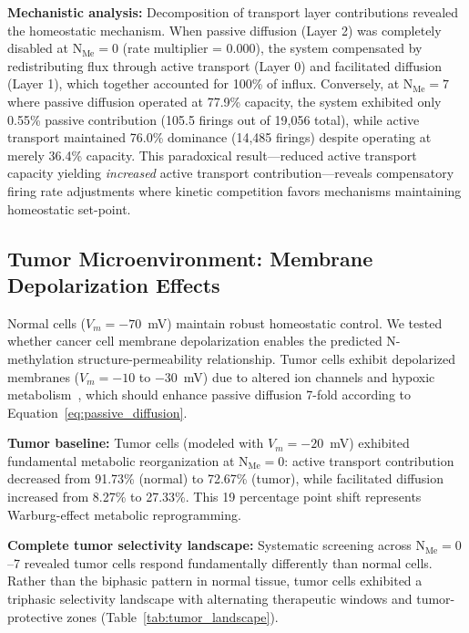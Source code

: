 \documentclass[10pt,letterpaper]{article}
\begin{document}
\textbf{Mechanistic analysis:} Decomposition of transport layer contributions revealed the homeostatic mechanism. When passive diffusion (Layer 2) was completely disabled at N$_{\text{Me}} = 0$ (rate multiplier = 0.000), the system compensated by redistributing flux through active transport (Layer 0) and facilitated diffusion (Layer 1), which together accounted for 100\% of influx. Conversely, at N$_{\text{Me}} = 7$ where passive diffusion operated at 77.9\% capacity, the system exhibited only 0.55\% passive contribution (105.5 firings out of 19,056 total), while active transport maintained 76.0\% dominance (14,485 firings) despite operating at merely 36.4\% capacity. This paradoxical result---reduced active transport capacity yielding \textit{increased} active transport contribution---reveals compensatory firing rate adjustments where kinetic competition favors mechanisms maintaining homeostatic set-point.

\subsection{Tumor Microenvironment: Membrane Depolarization Effects}

Normal cells ($V_m = -70$~mV) maintain robust homeostatic control. We tested whether cancer cell membrane depolarization enables the predicted N-methylation structure-permeability relationship. Tumor cells exhibit depolarized membranes ($V_m = -10$ to $-30$~mV) due to altered ion channels and hypoxic metabolism~\cite{Vaupel1989}, which should enhance passive diffusion 7-fold according to Equation~\ref{eq:passive_diffusion}.

\textbf{Tumor baseline:} Tumor cells (modeled with $V_m = -20$~mV) exhibited fundamental metabolic reorganization at N$_{\text{Me}} = 0$: active transport contribution decreased from 91.73\% (normal) to 72.67\% (tumor), while facilitated diffusion increased from 8.27\% to 27.33\%. This 19 percentage point shift represents Warburg-effect metabolic reprogramming.

\textbf{Complete tumor selectivity landscape:} Systematic screening across N$_{\text{Me}} = 0$--7 revealed tumor cells respond fundamentally differently than normal cells. Rather than the biphasic pattern in normal tissue, tumor cells exhibited a triphasic selectivity landscape with alternating therapeutic windows and tumor-protective zones (Table~\ref{tab:tumor_landscape}).
\end{document}

